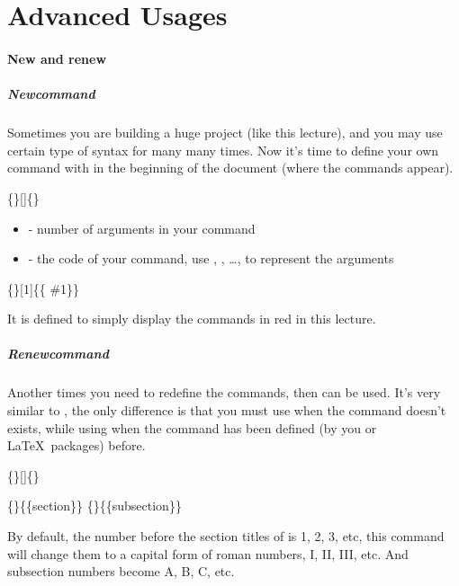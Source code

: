 \part{Advanced Usages}
\subsection{New and renew}

\begin{frame}
	\frametitle{Newcommand}
	Sometimes you are building a huge project (like this lecture), and you may use certain type of syntax for many many times. Now it's time to define your own command with  in the beginning of the document (where the  commands appear).
	\begin{command}
		\{\}[]\{\}
		\begin{itemize}
			\item {} - number of arguments in your command
			\item {} - the code of your command, use , , \dots,  to represent the arguments
		\end{itemize}
	\end{command}
	\begin{example}
		\{\}[1]\{\{ \#1\}\}
	\end{example}
	It is defined to simply display the commands in red in this lecture.
\end{frame}

\begin{frame}
	\frametitle{Renewcommand}
	Another times you need to redefine the commands, then  can be used. It's very similar to , the only difference is that you must use  when the command doesn't exists, while using  when the command has been defined (by you or \LaTeX\ packages) before.
	\begin{command}
		\{\}[]\{\structure{code}\}
	\end{command}
	\begin{example}
		\{\}\{\{section\}\}
		\{\}\{\{subsection\}\}
	\end{example}
	By default, the number before the section titles of  is 1, 2, 3, etc, this command will change them to a capital form of roman numbers, I, II, III, etc. And subsection numbers become A, B, C, etc.
\end{frame}

